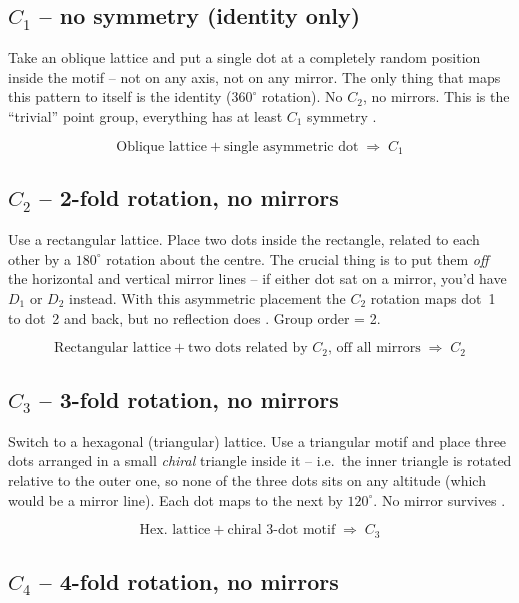 \documentclass[12pt,a4paper]{article}
\begin{document}
\subsection*{$C_1$ -- no symmetry (identity only)}

Take an oblique lattice and put a single dot at a completely random position inside the
motif -- not on any axis, not on any mirror. The only thing that maps this pattern to
itself is the identity ($360^\circ$ rotation). No $C_2$, no mirrors. This is the
``trivial'' point group, everything has at least $C_1$ symmetry \cite{Burns1990}.

\[
\boxed{\text{Oblique lattice} + \text{single asymmetric dot} \;\Rightarrow\; C_1}
\]

\subsection*{$C_2$ -- 2-fold rotation, no mirrors}

Use a rectangular lattice. Place two dots inside the rectangle, related to each other
by a $180^\circ$ rotation about the centre. The crucial thing is to put them
\emph{off} the horizontal and vertical mirror lines -- if either dot sat on a mirror,
you'd have $D_1$ or $D_2$ instead. With this asymmetric placement the $C_2$ rotation
maps dot~1 to dot~2 and back, but no reflection does \cite{Kittel2005}. Group order = 2.

\[
\boxed{\text{Rectangular lattice} + \text{two dots related by }C_2\text{, off all mirrors} \;\Rightarrow\; C_2}
\]

\subsection*{$C_3$ -- 3-fold rotation, no mirrors}

Switch to a hexagonal (triangular) lattice. Use a triangular motif and place three
dots arranged in a small \emph{chiral} triangle inside it -- i.e.\ the inner triangle
is rotated relative to the outer one, so none of the three dots sits on any altitude
(which would be a mirror line). Each dot maps to the next by $120^\circ$. No mirror
survives \cite{Hammond2015}.

\[
\boxed{\text{Hex. lattice} + \text{chiral 3-dot motif} \;\Rightarrow\; C_3}
\]

\subsection*{$C_4$ -- 4-fold rotation, no mirrors}
\end{document}
